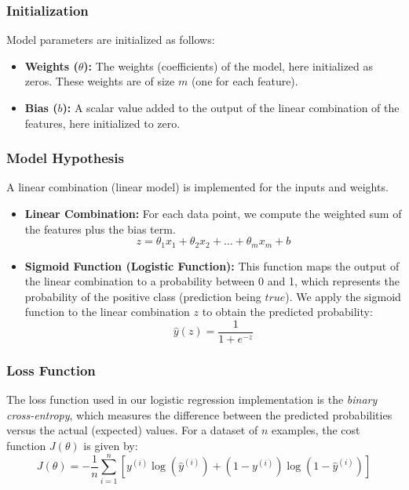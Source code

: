 \documentclass{article}
\theoremstyle{plain}
\theoremstyle{definition}
\theoremstyle{remark}
\begin{document}
\subsubsection{Initialization}

Model parameters are initialized as follows:

\begin{itemize}
\item \textbf{Weights ($\theta$):} The weights (coefficients) of the model, here initialized as zeros. These weights are of size $m$ (one for each feature).

\item \textbf{Bias ($b$):} A scalar value added to the output of the linear combination of the features, here initialized to zero.

\end{itemize}


\subsubsection{Model Hypothesis}

A linear combination (linear model) is implemented for the inputs and weights.

\begin{itemize}

\item \textbf{Linear Combination:} For each data point, we compute the weighted sum of the features plus the bias term.
$$
z = \theta_1 x_1 + \theta_2 x_2 + \dots + \theta_m x_m + b
$$

\item \textbf{Sigmoid Function (Logistic Function):} This function maps the output of the linear combination to a probability between 0 and 1, which represents the probability of the positive class (prediction being $true$). We apply the sigmoid function to the linear combination $z$ to obtain the predicted probability:
$$
\hat{y}(z) = \frac{1}{1 + e^{-z}}
$$

\end{itemize}


\subsubsection{Loss Function}

The loss function used in our logistic regression implementation is the \textit{binary cross-entropy}, which measures the difference between the predicted probabilities versus the actual (expected) values. For a dataset of $n$ examples, the cost function $J(\theta)$ is given by:
$$
J(\theta) = -\frac{1}{n} \sum_{i=1}^{n} \left[ y^{(i)} \log(\hat{y}^{(i)}) + (1 - y^{(i)}) \log(1 - \hat{y}^{(i)}) \right]
$$
\end{document}
